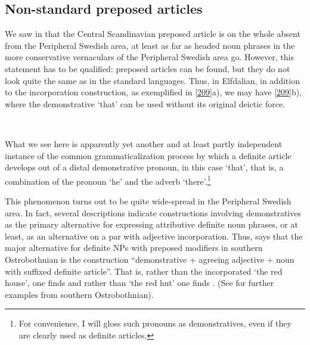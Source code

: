 \subsection{Non-standard preposed articles }
\label{sec:4.3.4}

We saw in  that the Central Scandinavian preposed article is on the whole absent from the Peripheral Swedish area, at least as far as headed noun phrases in the more conservative vernaculars of the Peripheral Swedish area go. However, this statement has to be qualified: preposed articles can be found, but they do not look quite the same as in the standard languages. Thus, in Elfdalian, in addition to the incorporation construction, as exemplified in \ref{209}a), we may have \ref{209}b), where the demonstrative  ‘that’ can be used without its original deictic force.

\ea\label{}
\\

\z 
\z 

What we see here is apparently yet another and at least partly independent instance of the common grammaticalization process by which a definite article develops out of a distal demonstrative pronoun, in this case  ‘that’, that is, a combination of the pronoun  ‘he’ and the adverb  ‘there’.\footnote{ For convenience, I will gloss such pronouns as demonstratives, even if they are clearly used as definite articles.} 

This phenomenon turns out to be quite wide-spread in the Peripheral Swedish area. In fact, several descriptions indicate constructions involving demonstratives as the primary alternative for expressing attributive definite noun phrases, or at least, as an alternative on a par with adjective incorporation. Thus, \citet{Ivars2005} says that the major alternative for definite NPs with preposed modifiers in southern Ostrobothnian is the construction “demonstrative  + agreeing adjective + noun with suffixed definite article”. That is, rather than the incorporated  ‘the red house’, one finds  and rather than  ‘the red hut’ one finds . (See \citet[158]{Vangsnes2003} for further examples from southern Ostrobothnian). 

